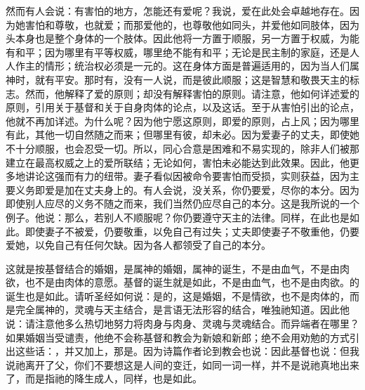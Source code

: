 然而有人会说：有害怕的地方，怎能还有爱呢？我说，爱在此处会卓越地存在。因为她害怕和尊敬，也就爱；而那爱他的，也尊敬他如同头，并爱他如同肢体，因为头本身也是整个身体的一个肢体。因此他将一方置于顺服，另一方置于权威，为能有和平；因为哪里有平等权威，哪里绝不能有和平；无论是民主制的家庭，还是人人作主的情形；统治权必须是一元的。这在身体方面是普遍适用的，因为当人们属神时，就有平安。那时有，没有一人说，而是彼此顺服；这是智慧和敬畏天主的标志。然而，他解释了爱的原则；却没有解释害怕的原则。请注意，他如何详述爱的原则，引用关于基督和关于自身肉体的论点，以及这话。至于从害怕引出的论点，他就不再加详述。为什么呢？因为他宁愿这原则，即爱的原则，占上风；因为哪里有此，其他一切自然随之而来；但哪里有彼，却未必。因为爱妻子的丈夫，即使她不十分顺服，也会忍受一切。所以，同心合意是困难和不易实现的，除非人们被那建立在最高权威之上的爱所联结；无论如何，害怕未必能达到此效果。因此，他更多地讲论这强而有力的纽带。妻子看似因被命令要害怕而受损，实则获益，因为主要义务即爱是加在丈夫身上的。有人会说，没关系，你仍要爱，尽你的本分。因为即使别人应尽的义务不随之而来，我们当然仍应尽自己的本分。这是我所说的一个例子。他说：那么，若别人不顺服呢？你仍要遵守天主的法律。同样，在此也是如此。即使妻子不被爱，仍要敬重，以免自己有过失；丈夫即使妻子不敬重他，仍要爱她，以免自己有任何欠缺。因为各人都领受了自己的本分。\newline{}\par

这就是按基督结合的婚姻，是属神的婚姻，属神的诞生，不是由血气，不是由肉欲，也不是由肉体的意愿。基督的诞生就是如此，不是由血气，也不是由肉欲。的诞生也是如此。请听圣经如何说：是的，这是婚姻，不是情欲，也不是肉体的，而是完全属神的，灵魂与天主结合，是言语无法形容的结合，唯独祂知道。因此他说：请注意他多么热切地努力将肉身与肉身、灵魂与灵魂结合。而异端者在哪里？如果婚姻当受谴责，他绝不会称基督和教会为新娘和新郎；绝不会用劝勉的方式引出这些话：，并又加上，那是。因为诗篇作者论到教会也说：因此基督也说：但我说祂离开了父，你们不要想这是人间的变迁，如同一词一样，并不是说祂真地出来了，而是指祂的降生成人，同样，也是如此。\par

